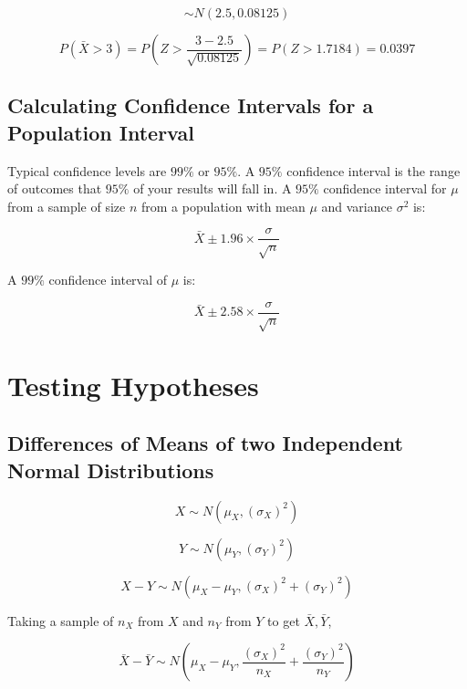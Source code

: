 \documentclass{article}
\begin{document}
\[\sim N\left(2.5, 0.08125\right)\]

\[P\left(\bar{X} > 3\right) = P\left(Z > \frac{3 - 2.5}{\sqrt{0.08125}}\right) =
P\left(Z > 1.7184\right) = 0.0397\]

\subsection{Calculating Confidence Intervals for a Population Interval}

Typical confidence levels are $99\%$ or $95\%$. A $95\%$ confidence interval is
the range of outcomes that $95\%$ of your results will fall in. A $95\%$
confidence interval for $\mu$ from a sample of size $n$ from a population with
mean $\mu$ and variance $\sigma^2$ is:

\[\bar{X} \pm 1.96 \times \frac{\sigma}{\sqrt{n}}\]

\noindent A $99\%$ confidence interval of $\mu$ is:

\[\bar{X} \pm 2.58 \times \frac{\sigma}{\sqrt{n}}\]

\begin{figure}
    
    \begin{tikzpicture}

    \end{tikzpicture}

\end{figure}

\section{Testing Hypotheses}

\subsection{Differences of Means of two Independent Normal Distributions}

\[X \sim N\left(\mu_X, \left(\sigma_X\right)^2\right)\]

\[Y \sim N\left(\mu_Y, \left(\sigma_Y\right)^2\right)\]

\[X - Y \sim N\left(\mu_X - \mu_Y, \left(\sigma_X\right)^2 +
\left(\sigma_Y\right)^2\right)\]

\noindent Taking a sample of $n_X$ from $X$ and $n_Y$ from $Y$ to get $\bar{X},
\bar{Y}$,

\begin{equation}\bar{X} - \bar{Y} \sim N\left(\mu_X - \mu_Y,
        \frac{\left(\sigma_X\right)^2}{n_X} +
\frac{\left(\sigma_Y\right)^2}{n_Y}\right)\end{equation}
\end{document}
